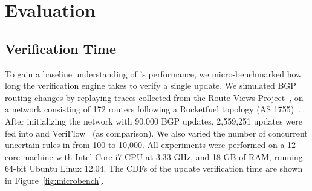 \section{Evaluation}
\label{sec:eval}


\subsection{Verification Time}
\label{sec:microbenchmark}

To gain a baseline understanding of \name's performance, we micro-benchmarked how long the verification engine takes to verify a single update.
We simulated BGP routing changes by replaying traces collected from the Route Views Project~\cite{RouteViews}, 
on a network consisting of 172 routers following a Rocketfuel topology (AS 1755)~\cite{Rocketfuel}.
After initializing the network with 90,000 BGP updates, 2,559,251 updates were fed into \name and VeriFlow~\cite{VeriFlow} (as comparison).
We also varied the number of concurrent uncertain rules in \name from 100 to 10,000. All experiments were performed on a 12-core machine with Intel Core i7 CPU at 3.33 GHz, and 18 GB of RAM, running 64-bit Ubuntu Linux 12.04. The CDFs of the update verification time are shown in Figure~\ref{fig:microbench}.

